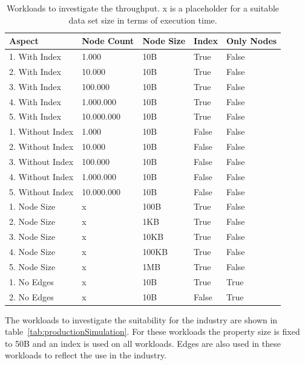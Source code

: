 \begin{table}[!h]
  \begin{minipage}{\textwidth}
    \begin{tabularx}{\textwidth}{ | X | X | X | X | X | }
      \hline
      Aspect & Node Count & Node Size & Index & Only Nodes \\ \hline
      1. With Index & 1.000 & 10B & True & False \\ \hline
      2. With Index & 10.000 & 10B & True & False \\ \hline
      3. With Index & 100.000 & 10B & True & False \\ \hline
      4. With Index & 1.000.000 & 10B & True & False \\ \hline
      5. With Index & 10.000.000 & 10B & True & False \\ \hline
      1. Without Index & 1.000 & 10B & False & False \\ \hline
      2. Without Index & 10.000 & 10B & False & False \\ \hline
      3. Without Index & 100.000 & 10B & False & False \\ \hline
      4. Without Index & 1.000.000 & 10B & False & False \\ \hline
      5. Without Index & 10.000.000 & 10B & False & False \\ \hline
      1. Node Size & x & 100B & True & False \\ \hline
      2. Node Size & x & 1KB & True & False \\ \hline
      3. Node Size & x & 10KB & True & False \\ \hline
      4. Node Size & x & 100KB & True & False \\ \hline
      5. Node Size & x & 1MB & True & False \\ \hline
      1. No Edges & x & 10B & True & True \\ \hline
      2. No Edges & x & 10B & False & True \\ \hline
    \end{tabularx}
  \end{minipage}
  \caption{Workloads to investigate the throughput. x is a placeholder for a suitable data set size in terms of execution time.}
  \label{tab:throughput}
\end{table}

The workloads to investigate the suitability for the industry are shown in table~\ref{tab:productionSimulation}.
For these workloads the property size is fixed to 50B and an index is used on all workloads.
Edges are also used in these workloads to reflect the use in the industry.

